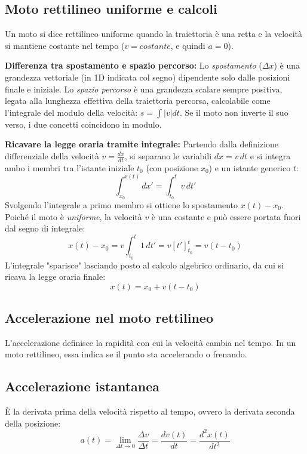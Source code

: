 \documentclass[12pt]{article}
\begin{document}
\subsection*{Moto rettilineo uniforme e calcoli}
Un moto si dice rettilineo uniforme quando la traiettoria è una retta e la velocità si mantiene costante nel tempo ($v = costante$, e quindi $a = 0$). %

\textbf{Differenza tra spostamento e spazio percorso:}
Lo \textit{spostamento} ($\Delta x$) è una grandezza vettoriale (in 1D indicata col segno) dipendente solo dalle posizioni finale e iniziale. Lo \textit{spazio percorso} è una grandezza scalare sempre positiva, legata alla lunghezza effettiva della traiettoria percorsa, calcolabile come l'integrale del modulo della velocità: $s = \int |v| dt$. Se il moto non inverte il suo verso, i due concetti coincidono in modulo.

\textbf{Ricavare la legge oraria tramite integrale:}
Partendo dalla definizione differenziale della velocità $v = \frac{dx}{dt}$, si separano le variabili $dx = v \, dt$ e si integra ambo i membri tra l'istante iniziale $t_0$ (con posizione $x_0$) e un istante generico $t$:
\begin{equation}
\int_{x_0}^{x(t)} dx' = \int_{t_0}^{t} v \, dt'
\end{equation}
Svolgendo l'integrale a primo membro si ottiene lo spostamento $x(t) - x_0$. Poiché il moto è \textit{uniforme}, la velocità $v$ è una costante e può essere portata fuori dal segno di integrale:
\begin{equation}
x(t) - x_0 = v \int_{t_0}^{t} 1 \, dt' = v [t']_{t_0}^t = v(t - t_0)
\end{equation}
L'integrale "sparisce" lasciando posto al calcolo algebrico ordinario, da cui si ricava la legge oraria finale: %
\begin{equation}
x(t) = x_0 + v(t - t_0) \tag{1.4}
\end{equation}

\subsection*{Accelerazione nel moto rettilineo}
L'accelerazione definisce la rapidità con cui la velocità cambia nel tempo. In un moto rettilineo, essa indica se il punto sta accelerando o frenando.

\subsection*{Accelerazione istantanea}
È la derivata prima della velocità rispetto al tempo, ovvero la derivata seconda della posizione: %
\begin{equation}
a(t) = \lim_{\Delta t \to 0} \frac{\Delta v}{\Delta t} = \frac{dv(t)}{dt} = \frac{d^2x(t)}{dt^2} \tag{1.6}
\end{equation}
\end{document}
